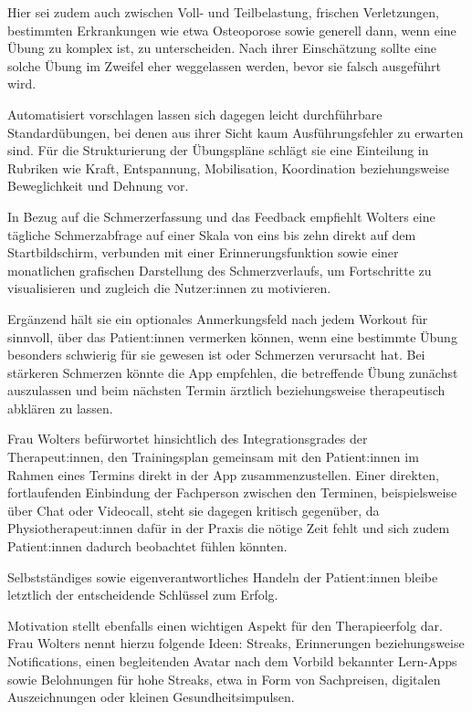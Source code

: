 Hier sei zudem auch zwischen Voll- und Teilbelastung, frischen Verletzungen, bestimmten Erkrankungen wie etwa Osteoporose sowie generell dann, wenn eine Übung zu komplex ist, zu unterscheiden. Nach ihrer Einschätzung sollte eine solche Übung im Zweifel eher weggelassen werden, bevor sie falsch ausgeführt wird.

Automatisiert vorschlagen lassen sich dagegen leicht durchführbare Standardübungen, bei denen aus ihrer Sicht kaum Ausführungsfehler zu erwarten sind. Für die Strukturierung der Übungspläne schlägt sie eine Einteilung in Rubriken wie Kraft, Entspannung, Mobilisation, Koordination beziehungsweise Beweglichkeit und Dehnung vor.

In Bezug auf die Schmerzerfassung und das Feedback empfiehlt Wolters eine tägliche Schmerzabfrage auf einer Skala von eins bis zehn direkt auf dem Startbildschirm, verbunden mit einer Erinnerungsfunktion sowie einer monatlichen grafischen Darstellung des Schmerzverlaufs, um Fortschritte zu visualisieren und zugleich die Nutzer:innen zu motivieren.

Ergänzend hält sie ein optionales Anmerkungsfeld nach jedem Workout für sinnvoll, über das Patient:innen vermerken können, wenn eine bestimmte Übung besonders schwierig für sie gewesen ist oder Schmerzen verursacht hat. Bei stärkeren Schmerzen könnte die App empfehlen, die betreffende Übung zunächst auszulassen und beim nächsten Termin ärztlich beziehungsweise therapeutisch abklären zu lassen.

Frau Wolters befürwortet hinsichtlich des Integrationsgrades der Therapeut:innen, den Trainingsplan gemeinsam mit den Patient:innen im Rahmen eines Termins direkt in der App zusammenzustellen. Einer direkten, fortlaufenden Einbindung der Fachperson zwischen den Terminen, beispielsweise über Chat oder Videocall, steht sie dagegen kritisch gegenüber, da Physiotherapeut:innen dafür in der Praxis die nötige Zeit fehlt und sich zudem Patient:innen dadurch beobachtet fühlen könnten.

Selbstständiges sowie eigenverantwortliches Handeln der Patient:innen bleibe letztlich der entscheidende Schlüssel zum Erfolg.

Motivation stellt ebenfalls einen wichtigen Aspekt für den Therapieerfolg dar. Frau Wolters nennt hierzu folgende Ideen: Streaks, Erinnerungen beziehungsweise Notifications, einen begleitenden Avatar nach dem Vorbild bekannter Lern-Apps sowie Belohnungen für hohe Streaks, etwa in Form von Sachpreisen, digitalen Auszeichnungen oder kleinen Gesundheitsimpulsen.

